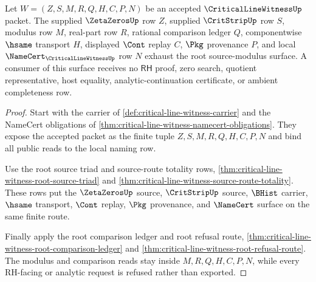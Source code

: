 \begin{theorem}
\label{thm:critical-line-witness-strip-modulus-source-exhaustion}
Let $W=(Z,S,M,R,Q,H,C,P,N)$ be an accepted $\CriticalLineWitnessUp$ packet. The supplied $\ZetaZerosUp$ row $Z$, supplied $\CritStripUp$ row $S$, modulus row $M$, real-part row $R$, rational comparison ledger $Q$, componentwise $\hsame$ transport $H$, displayed $\Cont$ replay $C$, $\Pkg$ provenance $P$, and local $\NameCert_{\CriticalLineWitnessUp}$ row $N$ exhaust the root source-modulus surface. A consumer of this surface receives no $\mathsf{RH}$ proof, zero search, quotient representative, host equality, analytic-continuation certificate, or ambient completeness row.
\end{theorem}
\begin{proof}
Start with the carrier of \autoref{def:critical-line-witness-carrier} and the NameCert obligations of \autoref{thm:critical-line-witness-namecert-obligations}. They expose the accepted packet as the finite tuple $Z,S,M,R,Q,H,C,P,N$ and bind all public reads to the local naming row.

Use the root source triad and source-route totality rows, \autoref{thm:critical-line-witness-root-source-triad} and \autoref{thm:critical-line-witness-source-route-totality}. These rows put the $\ZetaZerosUp$ source, $\CritStripUp$ source, $\BHist$ carrier, $\hsame$ transport, $\Cont$ replay, $\Pkg$ provenance, and $\NameCert$ surface on the same finite route.

Finally apply the root comparison ledger and root refusal route, \autoref{thm:critical-line-witness-root-comparison-ledger} and \autoref{thm:critical-line-witness-root-refusal-route}. The modulus and comparison reads stay inside $M,R,Q,H,C,P,N$, while every RH-facing or analytic request is refused rather than exported.
\end{proof}

